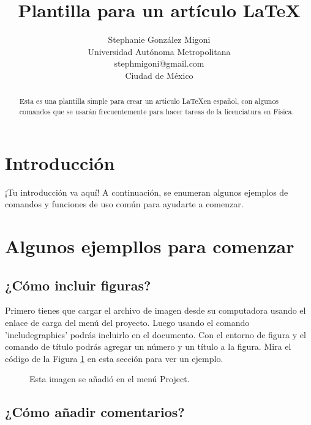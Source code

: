 \documentclass[a4paper]{article}
\title{Plantilla para un artículo \LaTeX}
\author{Stephanie González Migoni\\
	\small Universidad Autónoma Metropolitana\\
	\small stephmigoni@gmail.com\\
	\small Ciudad de México
	\date{}
}
\begin{document}
	\maketitle
	
	\begin{abstract}
		Esta es una plantilla simple para crear un articulo \LaTeX en español, con algunos comandos que se usarán frecuentemente para hacer tareas de la licenciatura en Física.
	\end{abstract}
	
	\section{Introducci\'on}
	
	¡Tu introducción va aquí! A continuación, se enumeran algunos ejemplos de comandos y funciones de uso común para ayudarte a comenzar.
	
	\section{Algunos ejempllos para comenzar}
	
	\subsection{¿Cómo incluir figuras?}
	
	Primero tienes que cargar el archivo de imagen desde su computadora usando el enlace de carga del menú del proyecto. Luego usando el comando 'includegraphics' podrás incluirlo en el documento. Con el entorno de figura y el comando de título podrás agregar un número y un título a la figura. Mira el código de la Figura \ref{fig:tesla} en esta sección para ver un ejemplo.
	
	\begin{figure}
		\centering
		\caption{\label{fig:tesla}Esta imagen se añadió en el menú Project.}
	\end{figure}
	
	
	\subsection{¿Cómo añadir comentarios?}
	
\end{document}
